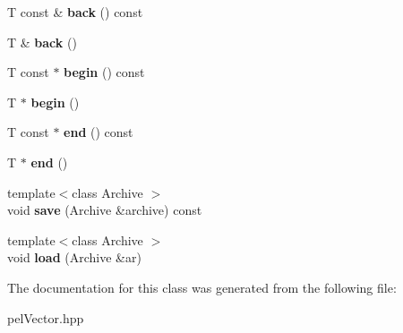 \begin{DoxyCompactItemize}
\item 
\hypertarget{classpel_1_1Vector_a283dd63d97b1e626a6f6fc32d4cc9fd5}{}T const \& {\bfseries back} () const \label{classpel_1_1Vector_a283dd63d97b1e626a6f6fc32d4cc9fd5}

\item 
\hypertarget{classpel_1_1Vector_ae7f8cc3c6afb0d650324943575a73ea9}{}T \& {\bfseries back} ()\label{classpel_1_1Vector_ae7f8cc3c6afb0d650324943575a73ea9}

\item 
\hypertarget{classpel_1_1Vector_ad9bce5db8f392bbe3614b7516bd0fba5}{}T const $\ast$ {\bfseries begin} () const \label{classpel_1_1Vector_ad9bce5db8f392bbe3614b7516bd0fba5}

\item 
\hypertarget{classpel_1_1Vector_a04166b80ef6b5fc33d8afa5d6aeaca07}{}T $\ast$ {\bfseries begin} ()\label{classpel_1_1Vector_a04166b80ef6b5fc33d8afa5d6aeaca07}

\item 
\hypertarget{classpel_1_1Vector_a1fd2729b6bcc3d90ba881277ba3bd17f}{}T const $\ast$ {\bfseries end} () const \label{classpel_1_1Vector_a1fd2729b6bcc3d90ba881277ba3bd17f}

\item 
\hypertarget{classpel_1_1Vector_a17255b938ee37228a7cc35c07e23d52f}{}T $\ast$ {\bfseries end} ()\label{classpel_1_1Vector_a17255b938ee37228a7cc35c07e23d52f}

\item 
\hypertarget{classpel_1_1Vector_aaee3091869f30a2b4db2774100647933}{}{\footnotesize template$<$class Archive $>$ }\\void {\bfseries save} (Archive \&archive) const \label{classpel_1_1Vector_aaee3091869f30a2b4db2774100647933}

\item 
\hypertarget{classpel_1_1Vector_a531d1f8c5149767ad545c37fe887088b}{}{\footnotesize template$<$class Archive $>$ }\\void {\bfseries load} (Archive \&ar)\label{classpel_1_1Vector_a531d1f8c5149767ad545c37fe887088b}

\end{DoxyCompactItemize}


The documentation for this class was generated from the following file\+:\begin{DoxyCompactItemize}
\item 
pel\+Vector.\+hpp\end{DoxyCompactItemize}
